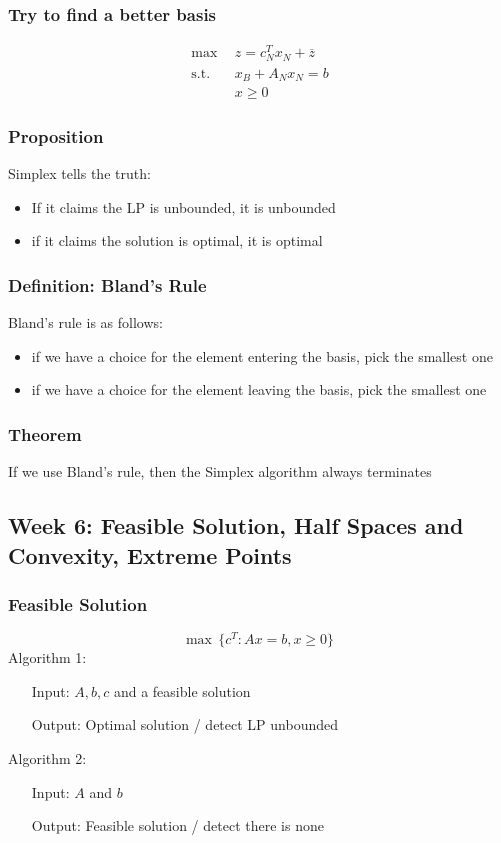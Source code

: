\documentclass[11pt]{article}
\begin{document}
\subsubsection*{Try to find a better basis}
\begin{align*}
  \text{max}\ \ &z=c^T_Nx_N + \overline{z} \\
  \text{s.t.}\ \ &x_B + A_Nx_N = b \\
                 &x\geq0
\end{align*}
\subsubsection{Proposition}
Simplex tells the truth:
\begin{itemize}
  \item If it claims the LP is unbounded, it is unbounded 
  \item if it claims the solution is optimal, it is optimal 
\end{itemize}
\subsubsection{Definition: Bland's Rule}
Bland's rule is as follows:
\begin{itemize}
  \item if we have a choice for the element entering the basis, pick the smallest one
  \item if we have a choice for the element leaving the basis, pick the smallest one 
\end{itemize}
\subsubsection{Theorem}
If we use Bland's rule, then the Simplex algorithm always terminates 
\subsection{Week 6: Feasible Solution, Half Spaces and Convexity, Extreme Points}
\subsubsection{Feasible Solution}
\[\text{max}\ \ \{c^T:Ax=b,x\geq0\}\]
Algorithm 1:
\begin{itemize}
  \item[Input:] $A,b,c$ and a feasible solution 
  \item[Output:] Optimal solution / detect LP unbounded 
\end{itemize}
Algorithm 2:
\begin{itemize}
  \item[Input:] $A$ and $b$
  \item[Output:] Feasible solution / detect there is none 
\end{itemize}
\end{document}
